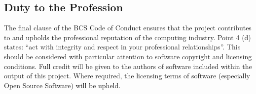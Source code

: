     \subsection{Duty to the Profession}
      The final clause of the BCS Code of Conduct ensures that the project contributes to and upholds the professional reputation of the computing industry. Point 4 (d) states: ``act with integrity and respect in your professional relationships''. This should be considered with particular attention to software copyright and licensing conditions. Full credit will be given to the authors of software included within the output of this project. Where required, the licensing terms of software (especially Open Source Software) will be upheld.
